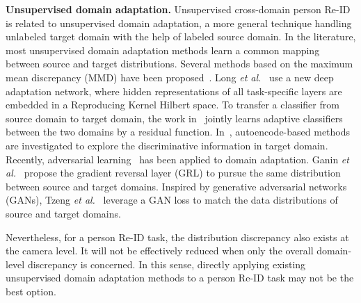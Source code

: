\documentclass[10pt,twocolumn,letterpaper]{article}
\begin{document}
\textbf{Unsupervised domain adaptation.} Unsupervised cross-domain person Re-ID is related to unsupervised domain adaptation, a more general technique handling unlabeled target domain with the help of labeled source domain. 
In the literature, most unsupervised domain adaptation methods learn a common mapping between source and target distributions. 
Several methods based on the maximum mean discrepancy (MMD) have been proposed~\cite{DBLP:conf/icml/LongC0J15,NIPS2016_6110,DBLP:journals/corr/ZhangYCW15,DBLP:journals/corr/TzengHZSD14}.
Long \textit{et al.}~\cite{DBLP:conf/icml/LongC0J15} use a new deep adaptation network, where hidden representations of all task-specific layers are embedded in a Reproducing Kernel Hilbert space. To transfer a classifier from source domain to target domain, the work in~\cite{NIPS2016_6110} jointly learns adaptive classifiers between the two domains by a residual function. In~\cite{DBLP:conf/eccv/GhifaryKZBL16,DBLP:conf/nips/BousmalisTSKE16}, autoencode-based methods are investigated to explore the discriminative information in target domain. Recently, adversarial learning~\cite{DBLP:conf/icml/GaninL15,DBLP:journals/corr/abs-1803-09210,DBLP:conf/cvpr/TzengHSD17} has been applied to domain adaptation. Ganin \textit{et al.}~\cite{DBLP:conf/icml/GaninL15} propose the gradient reversal layer (GRL) to pursue the same distribution between source and target domains. Inspired by generative adversarial networks (GANs),
Tzeng \textit{et al.}~\cite{DBLP:conf/cvpr/TzengHSD17} leverage a GAN loss to match the data distributions of source and target domains. 
 
Nevertheless, for a person Re-ID task, the distribution discrepancy also exists at the camera level. It will not be effectively reduced when only the overall domain-level discrepancy is concerned. In this sense, directly applying existing unsupervised domain adaptation methods to a person Re-ID task may not be the best option.
 
\end{document}
